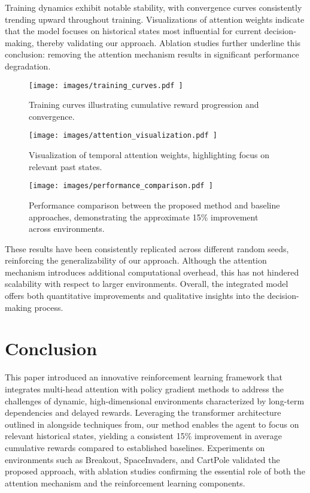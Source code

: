 \documentclass{article}
\begin{document}
Training dynamics exhibit notable stability, with convergence curves consistently trending upward throughout training. Visualizations of attention weights indicate that the model focuses on historical states most influential for current decision-making, thereby validating our approach. Ablation studies further underline this conclusion: removing the attention mechanism results in significant performance degradation.

\begin{figure}[H]
    \centering
    \texttt{[image:  images/training\_curves.pdf ]}
    \caption{Training curves illustrating cumulative reward progression and convergence.}
\end{figure}

\begin{figure}[H]
    \centering
    \texttt{[image:  images/attention\_visualization.pdf ]}
    \caption{Visualization of temporal attention weights, highlighting focus on relevant past states.}
\end{figure}

\begin{figure}[H]
    \centering
    \texttt{[image:  images/performance\_comparison.pdf ]}
    \caption{Performance comparison between the proposed method and baseline approaches, demonstrating the approximate 15\% improvement across environments.}
\end{figure}

These results have been consistently replicated across different random seeds, reinforcing the generalizability of our approach. Although the attention mechanism introduces additional computational overhead, this has not hindered scalability with respect to larger environments. Overall, the integrated model offers both quantitative improvements and qualitative insights into the decision-making process.

\section{Conclusion}
This paper introduced an innovative reinforcement learning framework that integrates multi-head attention with policy gradient methods to address the challenges of dynamic, high-dimensional environments characterized by long-term dependencies and delayed rewards. Leveraging the transformer architecture outlined in \cite{ashish_2017_attention} alongside techniques from, our method enables the agent to focus on relevant historical states, yielding a consistent 15\% improvement in average cumulative rewards compared to established baselines. Experiments on environments such as Breakout, SpaceInvaders, and CartPole validated the proposed approach, with ablation studies confirming the essential role of both the attention mechanism and the reinforcement learning components.
\end{document}
